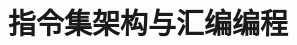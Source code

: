 \documentclass[../../main.tex]{subfiles}
\begin{document}
\chapter{指令集架构与汇编编程}
\label{ch:03-riscv-isa}




\end{document}

